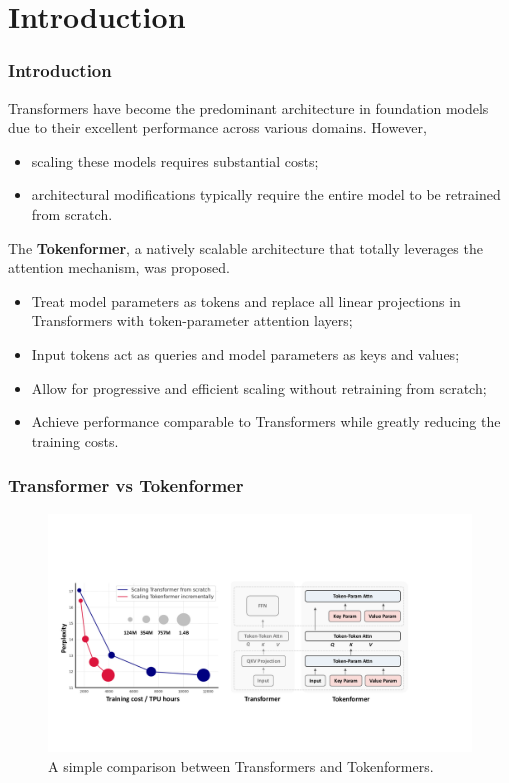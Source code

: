 \section{Introduction}
\begin{frame}
\frametitle{Introduction}
Transformers have become the predominant architecture
in foundation models due to their excellent performance
across various domains. However,
\begin{itemize}
    \item scaling these models requires substantial costs;
    \item architectural modifications typically require the entire
    model to be retrained from scratch.
\end{itemize}
The \textbf{Tokenformer}, a natively scalable architecture that totally
leverages the attention mechanism, was proposed.
\begin{itemize}
    \item Treat model parameters as tokens and replace all linear
    projections in Transformers with token-parameter attention layers;
    \item Input tokens act as queries and model parameters as keys
    and values;
    \item Allow for progressive and efficient scaling without retraining
    from scratch;
    \item Achieve performance comparable to Transformers while
    greatly reducing the training costs.
\end{itemize}
\end{frame}

\begin{frame}
\frametitle{Transformer vs Tokenformer}
\begin{figure}[h]
    \centering
    \includegraphics[width=0.99\linewidth]{./transformer-paper/intro_v4.pdf}
    \vspace{-0.1cm}
    \caption{A simple comparison between Transformers and Tokenformers.}
    \label{fig:intro_figure}
    \vspace{-6pt}
\end{figure}
\end{frame}